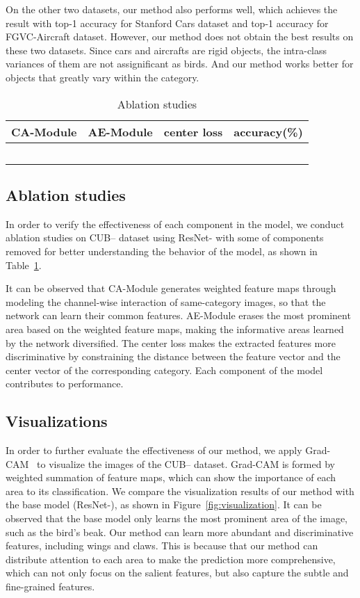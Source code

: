 \documentclass[conference]{IEEEtran}
\begin{document}
On the other two datasets, our method also performs well, which achieves the result with  top-1 accuracy for Stanford Cars dataset and  top-1 accuracy for FGVC-Aircraft dataset. However, our method does not obtain the best results on these two datasets. Since cars and aircrafts are rigid objects, the intra-class variances of them are not assignificant as birds. And our method works better for objects that greatly vary within the category.
\begin{table}
\begin{center}
\caption{Ablation studies} \label{tab:Ablation studies}
\begin{tabular}{c|c|c|c}
  \hline
  CA-Module & AE-Module & center loss & accuracy(\%)  \\
\hline
\hline
   &  &  &   \\
&  &  &  \\
 &  &  &   \\
&  &  &  \\
 &  &  &   \\
  \hline
\end{tabular}
\end{center}
\vspace{-0.2cm}
\end{table}
\subsection{Ablation studies}
In order to verify the effectiveness of each component in the model, we conduct ablation studies on CUB-- dataset using ResNet- with some of components removed for better understanding the behavior of the model, as shown in Table~\ref{tab:Ablation studies}. 

It can be observed that CA-Module generates weighted feature maps through modeling the channel-wise interaction of same-category images, so that the network can learn their common features. AE-Module erases the most prominent area based on the weighted feature maps, making the informative areas learned by the network diversified. The center loss makes the extracted features more discriminative by constraining the distance between the feature vector and the center vector of the corresponding category. Each component of the model contributes to performance.
\subsection{Visualizations}
In order to further evaluate the effectiveness of our method, we apply Grad-CAM~\cite{Selvaraju_2017_ICCV} to visualize the images of the CUB-- dataset. Grad-CAM is formed by weighted summation of feature maps, which can show the importance of each area to its classification. We compare the visualization results of our method with the base model (ResNet-), as shown in Figure~\ref{fig:visualization}. It can be observed that the base model only learns the most prominent area of the image, such as the bird's beak. Our method can learn more abundant and discriminative features, including wings and claws. This is because that our method can distribute attention to each area to make the prediction more comprehensive, which can not only focus on the salient features, but also capture the subtle and fine-grained features.
\end{document}
